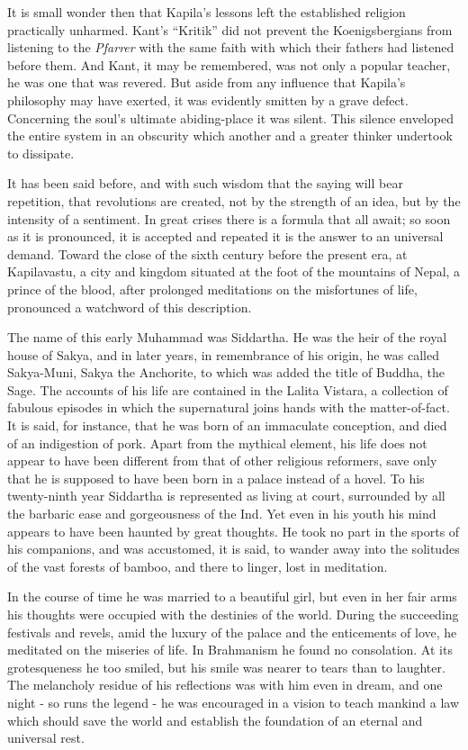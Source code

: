 \documentclass[]{book}
\begin{document}
It is small wonder then that Kapila's lessons left the established
religion practically unharmed. Kant's ``Kritik'' did not prevent the
Koenigsbergians from listening to the \emph{Pfarrer} with the same faith
with which their fathers had listened before them. And Kant, it may be
remembered, was not only a popular teacher, he was one that was revered.
But aside from any influence that Kapila's philosophy may have exerted,
it was evidently smitten by a grave defect. Concerning the soul's
ultimate abiding-place it was silent. This silence enveloped the entire
system in an obscurity which another and a greater thinker undertook to
dissipate.

It has been said before, and with such wisdom that the saying will bear
repetition, that revolutions are created, not by the strength of an
idea, but by the intensity of a sentiment. In great crises there is a
formula that all await; so soon as it is pronounced, it is accepted and
repeated it is the answer to an universal demand. Toward the close of
the sixth century before the present era, at Kapilavastu, a city and
kingdom situated at the foot of the mountains of Nepal, a prince of the
blood, after prolonged meditations on the misfortunes of life,
pronounced a watchword of this description.

The name of this early Muhammad was Siddartha. He was the heir of the
royal house of Sakya, and in later years, in remembrance of his origin,
he was called Sakya-Muni, Sakya the Anchorite, to which was added the
title of Buddha, the Sage. The accounts of his life are contained in the
Lalita Vistara, a collection of fabulous episodes in which the
supernatural joins hands with the matter-of-fact. It is said, for
instance, that he was born of an immaculate conception, and died of an
indigestion of pork. Apart from the mythical element, his life does not
appear to have been different from that of other religious reformers,
save only that he is supposed to have been born in a palace instead of a
hovel. To his twenty-ninth year Siddartha is represented as living at
court, surrounded by all the barbaric ease and gorgeousness of the Ind.
Yet even in his youth his mind appears to have been haunted by great
thoughts. He took no part in the sports of his companions, and was
accustomed, it is said, to wander away into the solitudes of the vast
forests of bamboo, and there to linger, lost in meditation.

In the course of time he was married to a beautiful girl, but even in
her fair arms his thoughts were occupied with the destinies of the
world. During the succeeding festivals and revels, amid the luxury of
the palace and the enticements of love, he meditated on the miseries of
life. In Brahmanism he found no consolation. At its grotesqueness he too
smiled, but his smile was nearer to tears than to laughter. The
melancholy residue of his reflections was with him even in dream, and
one night - so runs the legend - he was encouraged in a vision to teach
mankind a law which should save the world and establish the foundation
of an eternal and universal rest.
\end{document}
